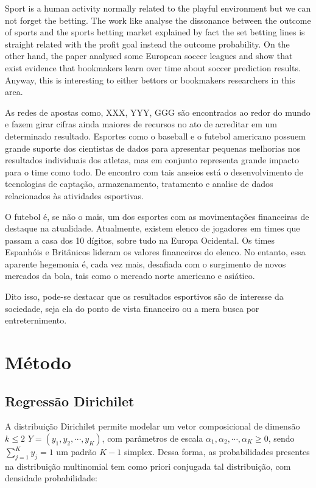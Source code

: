 \documentclass[review]{elsarticle}
\begin{document}
Sport is a human activity normally related to the playful environment but we can not forget the betting. The work like \cite{Kain2014} analyse the dissonance between the outcome of sports and the sports betting market explained by fact the set betting lines is straight related with the profit goal instead the outcome probability. On the other hand, the  paper \cite{Strumbelj2010} analysed  some European soccer leagues and show that exist evidence that bookmakers learn over time about soccer prediction results. Anyway, this is interesting to either bettors or bookmakers researchers in this area.


As redes de apostas como, XXX, YYY, GGG são encontrados ao redor do mundo e fazem girar cifras ainda maiores de recursos no ato de acreditar em um determinado resultado. Esportes como o baseball e o futebol americano possuem grande suporte dos cientistas de dados para apresentar pequenas melhorias nos resultados individuais dos atletas, mas em conjunto representa grande impacto para o time como todo. De encontro com tais anseios está o desenvolvimento de tecnologias de captação, armazenamento, tratamento e analise de dados relacionados às atividades esportivas.

O futebol é, se não o mais, um dos esportes com as movimentações financeiras de destaque na atualidade. Atualmente, existem elenco de jogadores em times que passam a casa dos 10 dígitos, sobre tudo na Europa Ocidental. Os times Espanhóis e Britânicos lideram os valores financeiros do elenco. No entanto, essa aparente hegemonia é, cada vez mais, desafiada com o surgimento de novos mercados da bola, tais como o mercado norte americano e asiático.



Dito isso, pode-se destacar que os resultados esportivos são de interesse da sociedade, seja ela do ponto de vista financeiro ou a mera busca por entreternimento.

\section{Método}
\label{sec:metodo}


\subsection{Regressão Dirichilet}
\label{sec:mod}
\noindent



A distribuição Dirichilet permite modelar um vetor composicional de dimensão $k\leq 2$ $Y = (y_1,y_2,\cdots,y_K)$, com parâmetros de escala $\alpha_1,\alpha_2,\cdots,\alpha_K\geq 0$, sendo $\sum_{j=1}^K y_j = 1$ um padrão $K-1$ simplex. Dessa forma, as probabilidades presentes na distribuição multinomial tem como priori conjugada tal distribuição, com densidade probabilidade:
\end{document}
